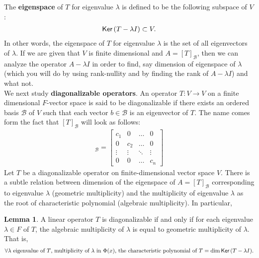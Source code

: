 \documentclass[letterpaper,11pt,twoside]{article}
\theoremstyle{definition}
\theoremstyle{definition}
\theoremstyle{definition}
\theoremstyle{definition}
\newtheorem{lemma}[proposition]{\textbf{Lemma}}
\theoremstyle{definition}
\theoremstyle{definition}
\theoremstyle{remark}
\theoremstyle{definition}
\newcommand{\Ker}[1]{{\fontfamily{lmss}\selectfont 
		\text{Ker}\left (#1\right )
}}
\begin{document}
    The \textbf{eigenspace} of $T$ for eigenvalue $\lambda$ is defined to be the following subspace of $V$:
    \begin{align*}
        \Ker{T-\lambda I} \subset V.
    \end{align*} 
    In other words, the eigenspace of $T$ for eigenvalue $\lambda$ is the set of all eigenvectors of $\lambda$. If we are given that $V$ is finite dimensional and $A = [T]_\mathcal{B}$, then we can analyze the operator $A-\lambda I$ in order to find, say dimension of eigenspace of $\lambda$ (which you will do by using rank-nullity and by finding the rank of $A-\lambda I$) and what not.\\
    
    We next study \textbf{diagonalizable operators}. An operator $T : V\to V$ on a finite dimensional $F$-vector space is said to be diagonalizable if there exists an ordered basis $\mathcal{B}$ of $V$ such that each vector $b\in \mathcal{B}$ is an eigenvector of $T$. The name comes form the fact that $[T]_\mathcal{B}$ will look as follows:
    \begin{align*}
      [T]_\mathcal{B} =   \begin{bmatrix}
            c_1 & 0 &\dots & 0\\
            0 & c_2 & \dots & 0\\
            \vdots & \vdots &\ddots & \vdots\\
            0 & 0 & \dots &c_n
        \end{bmatrix}
    \end{align*}
    Let $T$ be a diagonalizable operator on finite-dimensional vector space $V$. There is a subtle relation between dimension of the eigenspace of $A= [T]_\mathcal{B}$ corresponding to eigenvalue $\lambda $ (geometric multiplicity) and the multiplicity of eigenvalue $\lambda$ as the root of characteristic polynomial (algebraic multiplicity). In particular, 
    \begin{lemma}\label{L-2.0.2}
    A linear operator $T$ is diagonalizable if and only if for each eigenvalue $\lambda \in F$ of $T$, the algebraic multiplicity of $\lambda$ is equal to geometric multiplicity of $\lambda$. That is, 
    \begin{align*}
        \forall \lambda \text{ eigenvalue of $T$, multiplicity of $\lambda$ in $\Phi(x)$, the characteristic polynomial of $T$} = \dim \Ker{T-\lambda I}.
    \end{align*}
    \end{lemma}
\end{document}
